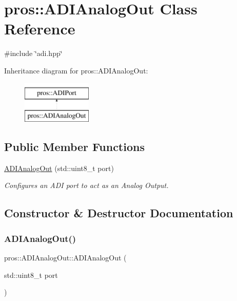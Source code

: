 \hypertarget{classpros_1_1ADIAnalogOut}{}\section{pros\+:\+:A\+D\+I\+Analog\+Out Class Reference}
\label{classpros_1_1ADIAnalogOut}


{\ttfamily \#include \char`\"{}adi.\+hpp\char`\"{}}

Inheritance diagram for pros\+:\+:A\+D\+I\+Analog\+Out\+:\begin{figure}[H]
\begin{center}
\leavevmode
\includegraphics[height=2.000000cm]{classpros_1_1ADIAnalogOut}
\end{center}
\end{figure}
\subsection*{Public Member Functions}
\begin{DoxyCompactItemize}
\item 
\hyperlink{classpros_1_1ADIAnalogOut_a1758096961a060dea379bd696c293d26}{A\+D\+I\+Analog\+Out} (std\+::uint8\+\_\+t port)
\begin{DoxyCompactList}\small\item\em Configures an A\+DI port to act as an Analog Output. \end{DoxyCompactList}\end{DoxyCompactItemize}


\subsection{Constructor \& Destructor Documentation}
\mbox{\label{classpros_1_1ADIAnalogOut_a1758096961a060dea379bd696c293d26}} 
\subsubsection{\texorpdfstring{A\+D\+I\+Analog\+Out()}{ADIAnalogOut()}}
{\footnotesize\ttfamily pros\+::\+A\+D\+I\+Analog\+Out\+::\+A\+D\+I\+Analog\+Out (\begin{DoxyParamCaption}\item[{std\+::uint8\+\_\+t}]{port }\end{DoxyParamCaption})}



